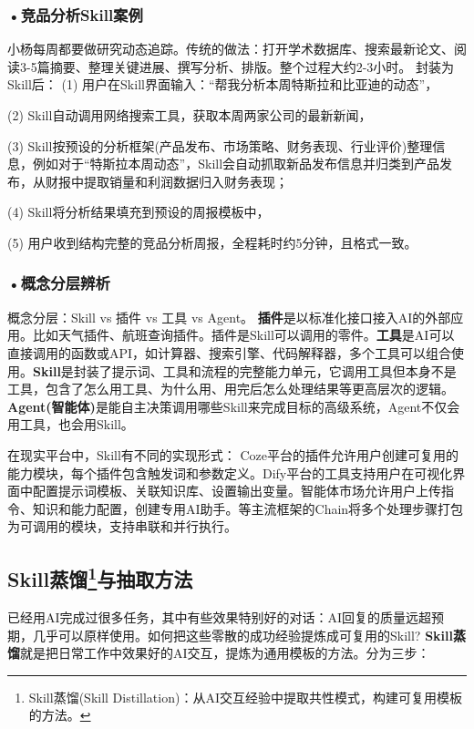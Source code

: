 \subsubsection*{\textbf{•竞品分析Skill案例}}

小杨每周都要做研究动态追踪。传统的做法：打开学术数据库、搜索最新论文、阅读3-5篇摘要、整理关键进展、撰写分析、排版。整个过程大约2-3小时。
封装为Skill后：
(1) 用户在Skill界面输入：“帮我分析本周特斯拉和比亚迪的动态”，

(2) Skill自动调用网络搜索工具，获取本周两家公司的最新新闻，

(3) Skill按预设的分析框架(产品发布、市场策略、财务表现、行业评价)整理信息，例如对于“特斯拉本周动态”，Skill会自动抓取新品发布信息并归类到产品发布，从财报中提取销量和利润数据归入财务表现；

(4) Skill将分析结果填充到预设的周报模板中，

(5) 用户收到结构完整的竞品分析周报，全程耗时约5分钟，且格式一致。


\subsubsection*{\textbf{•概念分层辨析}}
概念分层：Skill vs 插件 vs 工具 vs Agent。
\textbf{插件}是以标准化接口接入AI的外部应用。比如天气插件、航班查询插件。插件是Skill可以调用的零件。\textbf{工具}是AI可以直接调用的函数或API，如计算器、搜索引擎、代码解释器，多个工具可以组合使用。\textbf{Skill}是封装了提示词、工具和流程的完整能力单元，它调用工具但本身不是工具，包含了怎么用工具、为什么用、用完后怎么处理结果等更高层次的逻辑。\textbf{Agent(智能体)}是能自主决策调用哪些Skill来完成目标的高级系统，Agent不仅会用工具，也会用Skill。

在现实平台中，Skill有不同的实现形式：
Coze平台的插件允许用户创建可复用的能力模块，每个插件包含触发词和参数定义。Dify平台的工具支持用户在可视化界面中配置提示词模板、关联知识库、设置输出变量。智能体市场允许用户上传指令、知识和能力配置，创建专用AI助手。等主流框架的Chain将多个处理步骤打包为可调用的模块，支持串联和并行执行。

\subsection[Skill蒸馏与抽取方法]{\textbf{Skill蒸馏}\footnote{Skill蒸馏(Skill Distillation)：从AI交互经验中提取共性模式，构建可复用模板的方法。}与抽取方法}

已经用AI完成过很多任务，其中有些效果特别好的对话：AI回复的质量远超预期，几乎可以原样使用。如何把这些零散的成功经验提炼成可复用的Skill?
\textbf{Skill蒸馏}就是把日常工作中效果好的AI交互，提炼为通用模板的方法。分为三步：

